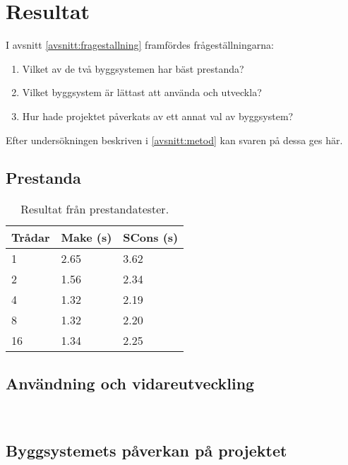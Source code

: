 \section{Resultat}
I avsnitt \ref{avsnitt:fragestallning} framfördes frågeställningarna:

\begin{enumerate}
\item Vilket av de två byggsystemen har bäst prestanda?
\item Vilket byggsystem är lättast att använda och utveckla?
\item Hur hade projektet påverkats av ett annat val av byggsystem?
\end{enumerate}

\noindent Efter undersökningen beskriven i \ref{avsnitt:metod} kan svaren på dessa ges här.

\subsection{Prestanda}
\begin{table}[h!]
  \centering
  \begin{tabular}{|l|l|l|}
    \hline
    \textbf{Trådar} & \textbf{Make} (s) & \textbf{SCons} (s) \\ \hline
    1 & 2.65 & 3.62 \\ \hline
    2 & 1.56 & 2.34 \\ \hline
    4 & 1.32 & 2.19 \\ \hline
    8 & 1.32 & 2.20 \\ \hline
    16 & 1.34 & 2.25 \\ \hline
  \end{tabular}
  \caption{Resultat från prestandatester.}
  \label{tabell:konfig}
\end{table}


\subsection{Användning och vidareutveckling}
 \\

\subsection{Byggsystemets påverkan på projektet}
